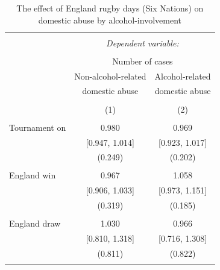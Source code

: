 \documentclass[12pt, a4paper]{article}
\begin{document}



\begin{table}[!htbp] \centering 
  \begin{threeparttable}
  \caption{The effect of England rugby days (Six Nations) on domestic abuse by alcohol-involvement} 
  \label{rugby} 
\begin{tabular}{@{\extracolsep{5pt}}lcc} 
\\[-1.8ex]\hline 
\hline \\[-1.8ex] 
 & \multicolumn{2}{c}{\textit{Dependent variable:}} \\ 
\cline{2-3} 
\\[-1.8ex] & \multicolumn{2}{c}{Number of cases} \\ 
 & Non-alcohol-related & Alcohol-related\\ 
 & domestic abuse & domestic abuse\\
\\[-1.8ex] & (1) & (2)\\ 
\hline \\[-1.8ex] 
Tournament on & 0.980 & 0.969 \\ 
  & [0.947, 1.014] & [0.923, 1.017] \\ 
  & (0.249) & (0.202) \\ 
  & & \\ 
 England win & 0.967 & 1.058 \\ 
  & [0.906, 1.033] & [0.973, 1.151] \\ 
  & (0.319) & (0.185) \\ 
  & & \\ 
 England draw & 1.030 & 0.966 \\ 
  & [0.810, 1.318] & [0.716, 1.308] \\ 
  & (0.811) & (0.822) \\ 
  & & \\ 

\end{tabular}
\end{threeparttable}
\end{table}
\end{document}
